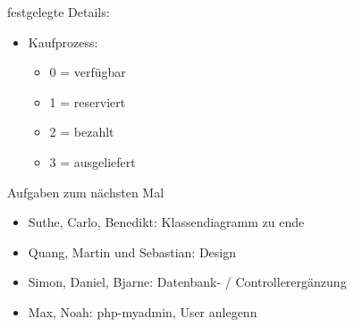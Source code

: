 \documentclass[11pt,a4paper]{scrbook}
\begin{document}
\newpage
\vspace*{1cm}
\Large{festgelegte Details:}
\normalsize
\begin{itemize}
\item Kaufprozess:
\begin{itemize}
\item 0 = verfügbar
\item 1 = reserviert
\item 2 = bezahlt
\item 3 = ausgeliefert
\end{itemize}

\end{itemize}

\vspace*{1cm}
\Large{Aufgaben zum nächsten Mal}
\normalsize
\begin{itemize}
\item Suthe, Carlo, Benedikt: Klassendiagramm zu ende
\item Quang, Martin und Sebastian: Design
\item Simon, Daniel, Bjarne: Datenbank- / Controllerergänzung
\item Max, Noah: php-myadmin, User anlegenn
\end{itemize}
\end{document}
